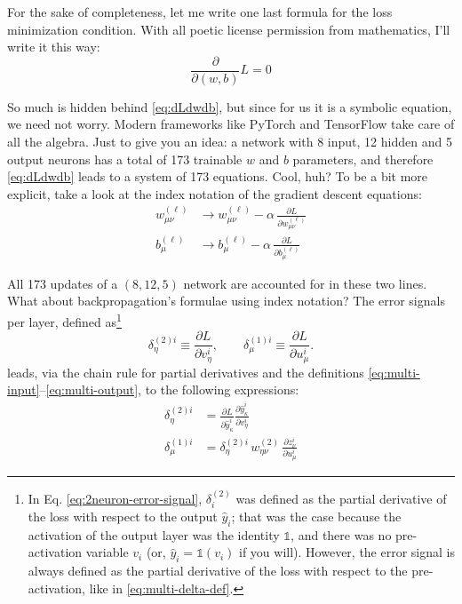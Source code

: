 \documentclass[11pt,a4paper,oneside]{book}
\theoremstyle{definition}
\theoremstyle{plain}
\theoremstyle{remark}
\begin{document}
For the sake of completeness, let me write one last formula for the loss minimization condition. With all poetic license permission from mathematics, I'll write it this way:
\begin{equation}
    \label{eq:dLdwdb}
    \frac{\partial}{\partial (w, b)} L = 0
\end{equation}

So much is hidden behind \eqref{eq:dLdwdb}, but since for us it is a symbolic equation, we need not worry. Modern frameworks like PyTorch and TensorFlow take care of all the algebra. Just to give you an idea: a network with 8 input, 12 hidden and 5 output neurons has a total of 173 trainable $w$ and $b$ parameters, and therefore \eqref{eq:dLdwdb} leads to a system of 173 equations. Cool, huh? To be a bit more explicit, take a look at the index notation of the gradient descent equations:
\begin{equation}
    \label{eq:multi-gd}
    \begin{split}
        w^{(\ell)}_{\mu\nu} &\to w^{(\ell)}_{\mu\nu} - \alpha\,\frac{\partial L}{\partial w^{(\ell)}_{\mu\nu}}\\[2pt]
        b^{(\ell)}_{\mu} &\to b^{(\ell)}_{\mu} - \alpha\,\frac{\partial L}{\partial b^{(\ell)}_{\mu}}
    \end{split}
\end{equation}

All 173 updates of a $(8,12,5)$ network are accounted for in these two lines. What about backpropagation's formulae using index notation? The error signals per layer, defined as\footnote{In Eq. \eqref{eq:2neuron-error-signal}, $\delta_i^{(2)}$ was defined as the partial derivative of the loss with respect to the output $\hat y_i$; that was the case because the activation of the output layer was the identity $\mathds{1}$, and there was no pre-activation variable $v_i$ (or, $\hat y_i=\mathds{1}(v_i)$ if you will). However, the error signal is always defined as the partial derivative of the loss with respect to the pre-activation, like in \eqref{eq:multi-delta-def}.}
\begin{equation}
    \label{eq:multi-delta-def}
    \delta^{(2)i}_\eta \equiv \frac{\partial L}{\partial v^i_\eta},
    \qquad
    \delta^{(1)i}_\mu \equiv \frac{\partial L}{\partial u^i_\mu}.
\end{equation}
leads, via the chain rule for partial derivatives and the definitions \eqref{eq:multi-input}–\eqref{eq:multi-output}, to the following expressions:
\begin{equation}
    \label{eq:multi-error-signals}
    \begin{split}
        \delta^{(2)i}_\eta &= \frac{\partial L}{\partial\hat y^i_\kappa}\frac{\partial \hat y^i_\kappa}{\partial v^i_\eta}\\
        \delta^{(1)i}_\mu &= \delta^{(2)i}_\eta\,w^{(2)}_{\eta\nu}\,\frac{\partial z^i_\nu}{\partial u^i_\mu}
    \end{split}
\end{equation}
\end{document}
